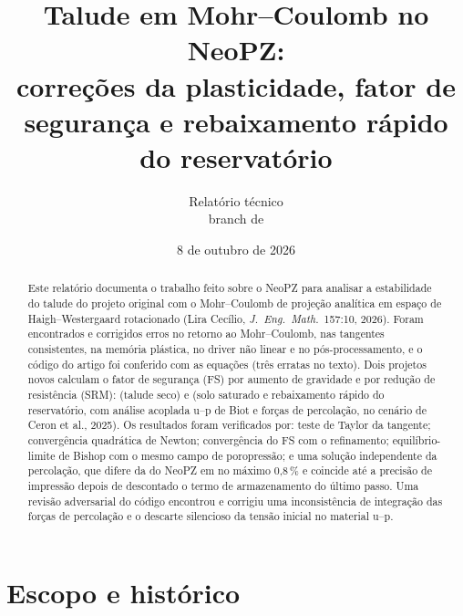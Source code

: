 \documentclass[11pt,a4paper]{article}
\title{Talude em Mohr--Coulomb no NeoPZ:\\
correções da plasticidade, fator de segurança e rebaixamento rápido do reservatório}
\author{Relatório técnico\\ branch \cc{branch_paper_mcc} de \cc{diogocecilio/neopz-master}}
\date{8 de outubro de 2026}
\begin{document}
\maketitle

\begin{abstract}
Este relatório documenta o trabalho feito sobre o NeoPZ para analisar a estabilidade do talude do
projeto original  com o Mohr--Coulomb de projeção analítica em espaço de
Haigh--Westergaard rotacionado (Lira Cecílio, \emph{J.\ Eng.\ Math.}\ 157:10, 2026). Foram encontrados e
corrigidos erros no retorno ao Mohr--Coulomb, nas tangentes consistentes, na memória plástica, no
driver não linear e no pós-processamento, e o código do artigo foi conferido com as equações (três
erratas no texto). Dois projetos novos calculam o fator de segurança (FS) por aumento de gravidade e
por redução de resistência (SRM):  (talude seco) e  (solo
saturado e rebaixamento rápido do reservatório, com análise acoplada u--p de Biot e forças de
percolação, no cenário de Ceron et al., 2025). Os resultados foram verificados por: teste de Taylor da
tangente; convergência quadrática de Newton; convergência do FS com o refinamento; equilíbrio-limite
de Bishop com o mesmo campo de poropressão; e uma solução independente da percolação, que difere da
do NeoPZ em no máximo 0,8\,\% e coincide até a precisão de impressão depois de descontado o termo de
armazenamento do último passo. Uma revisão adversarial do código encontrou e corrigiu uma
inconsistência de integração das forças de percolação e o descarte silencioso da tensão inicial no
material u--p.
\end{abstract}

\tableofcontents

\section{Escopo e histórico}
\end{document}
